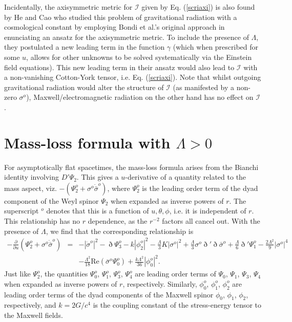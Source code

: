 \documentclass[aps,pre,preprint,superscriptaddress,showpacs,showkeys]{revtex4-1}
\begin{document}
Incidentally, the axisymmetric metric for $\mathcal{I}$ given by Eq. (\ref{scriaxi}) is also found by He and Cao \cite{chi1} who studied this problem of gravitational radiation with a cosmological constant by employing Bondi et al.'s original approach \cite{Bondi62} in enunciating an ansatz for the axisymmetric metric. To include the presence of $\Lambda$, they postulated a new leading term in the function $\gamma$ (which when prescribed for some $u$, allows for other unknowns to be solved systematically via the Einstein field equations). This new leading term in their ansatz would also lead to $\mathcal{I}$ with a non-vanishing Cotton-York tensor, i.e. Eq. (\ref{scriaxi}). Note that whilst outgoing gravitational radiation would alter the structure of $\mathcal{I}$ (as manifested by a non-zero $\sigma^o$), Maxwell/electromagnetic radiation on the other hand has no effect on $\mathcal{I}$ \cite{Vee2017,chi2}.

\section{Mass-loss formula with $\Lambda>0$}\label{Section3}

For asymptotically flat spacetimes, the mass-loss formula arises from the Bianchi identity involving $D'\Psi_2$. This gives a $u$-derivative of a quantity related to the mass aspect, viz. $-(\Psi^o_2+\sigma^o\dot{\bar{\sigma}}^o)$, where $\Psi^o_2$ is the leading order term of the dyad component of the Weyl spinor $\Psi_2$ when expanded as inverse powers of $r$. The superscript $^o$ denotes that this is a function of $u,\theta,\phi$, i.e. it is independent of $r$. This relationship has no $r$ dependence, as the $r^{-2}$ factors all cancel out. With the presence of $\Lambda$, we find that the corresponding relationship is \cite{Vee2017}
\begin{eqnarray}\label{masslosspreintegration}
-\frac{\partial}{\partial u}(\Psi^o_2+\sigma^o\dot{\bar{\sigma}}^o)&=&-|\dot{\sigma}^o|^2-\eth\Psi^o_3-k|\phi^o_2|^2-\frac{\Lambda}{3}K|\sigma^o|^2+\frac{\Lambda}{3}\sigma^o\eth'\eth\bar{\sigma}^o+\frac{\Lambda}{6}\eth'\Psi^o_1-\frac{2\Lambda^2}{9}|\sigma^o|^4\nonumber\\&&-\frac{\Lambda^2}{18}\textrm{Re}(\bar{\sigma}^o\Psi^o_0)+\frac{k\Lambda^2}{36}|\phi^o_0|^2.
\end{eqnarray}
Just like $\Psi^o_2$, the quantities $\Psi^o_0$, $\Psi^o_1$, $\Psi^o_3$, $\Psi^o_4$ are leading order terms of $\Psi_0$, $\Psi_1$, $\Psi_3$, $\Psi_4$ when expanded as inverse powers of $r$, respectively. Similarly, $\phi^o_0$, $\phi^o_1$, $\phi^o_2$ are leading order terms of the dyad components of the Maxwell spinor $\phi_0$, $\phi_1$, $\phi_2$, respectively, and $k=2G/c^4$ is the coupling constant of the stress-energy tensor to the Maxwell fields.
\end{document}
